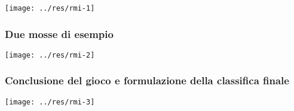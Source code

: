 \documentclass[a4paper,11pt]{article} %
\begin{document}
    \texttt{[image: ../res/rmi-1]}

    \newpage

    \subsubsection{Due mosse di esempio}

    \texttt{[image: ../res/rmi-2]}

    \newpage

    \subsubsection{Conclusione del gioco e formulazione della classifica finale}

    \texttt{[image: ../res/rmi-3]}

    \newpage
\end{document}
